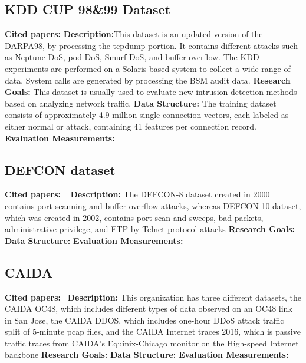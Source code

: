 \subsection{KDD CUP 98\&99 Dataset}
\textbf{Cited papers:}\newline
\textbf{Description:}This dataset is an updated version of the DARPA98,
by processing the tcpdump portion. It contains different attacks such as Neptune-DoS, pod-DoS, Smurf-DoS, and buffer-overflow. The KDD experiments are performed on a Solaris-based system to collect a wide range of data. System calls are generated by processing the BSM audit data. 
\textbf{Research Goals:} This dataset is usually used to evaluate new intrusion detection methods based on analyzing network traffic. \newline
\textbf{Data Structure:} The training dataset consists of approximately 4.9 million
single connection vectors, each labeled as either normal or attack, containing 41 features per connection record. \newline
\textbf{Evaluation Measurements:} \newline










\subsection{DEFCON dataset}
\textbf{Cited papers:} ~\cite{nehinbe2009simple} \newline
\textbf{Description:} The
DEFCON-8 dataset created in 2000 contains port scanning and buffer overflow attacks, whereas DEFCON-10 dataset, which was created in 2002,
contains port scan and sweeps, bad packets, administrative privilege, and FTP by Telnet protocol attacks\newline
\textbf{Research Goals:}  \newline
\textbf{Data Structure:} \newline
\textbf{Evaluation Measurements:} \newline





\subsection{CAIDA}
\textbf{Cited papers:}~\cite{shiravi2012toward} \newline
\textbf{Description:} This organization has three different datasets, the CAIDA OC48, which includes different types of data observed on an OC48 link in San Jose, the CAIDA DDOS, which includes one-hour DDoS attack traffic split of 5-minute pcap files, and the CAIDA Internet traces 2016, which is passive traffic traces from CAIDA’s Equinix-Chicago monitor on
the High-speed Internet backbone\newline
\textbf{Research Goals:}  \newline
\textbf{Data Structure:} \newline
\textbf{Evaluation Measurements:} \newline




